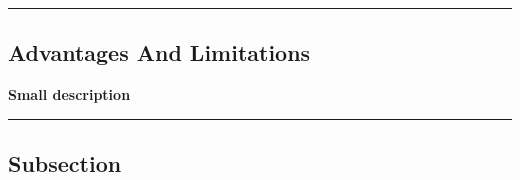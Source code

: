 {\color{gray}\hrule}
\begin{center}
\section{Advantages And Limitations}
\textbf{Small description}
\bigskip
\end{center}
{\color{gray}\hrule}
\begin{multicols}{2}
\subsection{Subsection}
\lipsum[1]
\end{multicols}

